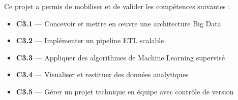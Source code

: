 Ce projet a permis de mobiliser et de valider les compétences suivantes :
\begin{itemize}
  \item \textbf{C3.1} — Concevoir et mettre en œuvre une architecture Big Data
  \item \textbf{C3.2} — Implémenter un pipeline ETL scalable
  \item \textbf{C3.3} — Appliquer des algorithmes de Machine Learning supervisé
  \item \textbf{C3.4} — Visualiser et restituer des données analytiques
  \item \textbf{C3.5} — Gérer un projet technique en équipe avec contrôle de version
\end{itemize}
